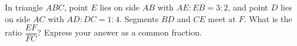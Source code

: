 In triangle $ABC$, point $E$ lies on side $AB$ with $AE:EB=3:2$, and point $D$ lies on side $AC$ with $AD:DC=1:4$. Segments $BD$ and $CE$ meet at $F$. What is the ratio $\dfrac{EF}{FC}$? Express your answer as a common fraction.
